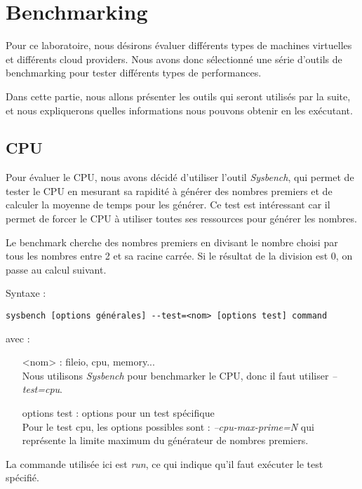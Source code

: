 \chapter{Benchmarking}

Pour ce laboratoire, nous désirons évaluer différents types de machines virtuelles et différents cloud providers. Nous avons donc sélectionné une série d'outils de benchmarking pour tester différents types de performances. 

Dans cette partie, nous allons présenter les outils qui seront utilisés par la suite, et nous expliquerons quelles informations nous pouvons obtenir en les exécutant.

\section{CPU}
Pour évaluer le CPU, nous avons décidé d'utiliser l'outil \textit{Sysbench}, qui permet de tester le CPU en mesurant sa rapidité à générer des nombres premiers et de calculer la moyenne de temps pour les générer. Ce test est intéressant car il permet de forcer le CPU à utiliser toutes ses ressources pour générer les nombres. \newline

Le benchmark cherche des nombres premiers en divisant le nombre choisi par tous les nombres entre 2 et sa racine carrée. Si le résultat de la division est 0, on passe au calcul suivant. \newline

Syntaxe : 
\begin{verbatim}
sysbench [options générales] --test=<nom> [options test] command
\end{verbatim}
avec : 
\begin{itemize}
\item [<nom>] : fileio, cpu, memory... \\
Nous utilisons \textit{Sysbench} pour benchmarker le CPU, donc il faut utiliser \textit{--test=cpu}.
\item [options test] : options pour un test spécifique \\ 
Pour le test cpu, les options possibles sont : \textit{--cpu-max-prime=N}  qui représente la limite maximum du générateur de nombres premiers. \newline
\end{itemize}

La commande utilisée ici est \textit{run}, ce qui indique qu'il faut exécuter le test spécifié.

